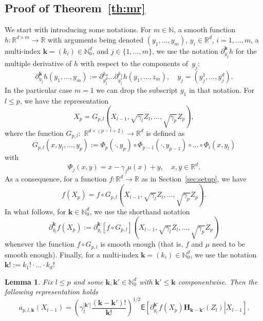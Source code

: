 \documentclass[article]{elsarticle}
\newtheorem{lem}[thm]{Lemma}
\begin{document}
\subsection{Proof of Theorem~\ref{th:mr}}
We start with introducing some notations.
For $m\in\mathbb N$, a smooth function
$h\colon\mathbb R^{d\times m}\to\mathbb R$
with arguments being denoted
$(y_1,\ldots,y_m)$, $y_i\in\mathbb R^d$, $i=1,\ldots,m$,
a multi-index $\mathbf k=(k_i)\in\mathbb N_0^d$,
and $j\in\{1,\ldots,m\}$,
we use the notation $\partial^{\mathbf k}_{y_j} h$ for the multiple derivative of $h$
with respect to the components of~$y_j$:
$$
\partial^{\mathbf k}_{y_j} h(y_1,\ldots,y_m)
:=\partial^{k_d}_{y_j^d}
\ldots
\partial^{k_1}_{y_j^1}
h(y_1,\ldots,z_m),
\quad y_j=(y_j^1,\ldots,y_j^d).
$$
In the particular case $m=1$ we can drop
the subscript $y_1$ in that notation.
For $l\le p$, we have the representation
\[
X_{p}=G_{p,l}(X_{l-1},\sqrt{\gamma_{l}}Z_{l},\ldots,\sqrt{\gamma_{p}}Z_{p}),
\]
where the function \(G_{p,l}:\) \(\mathbb{R}^{d\times(p-l+2)}\to \mathbb{R}^{d}\) is defined as
\begin{equation}
\label{eq:definition-G-p-l}
G_{p,l}(x,y_l,\ldots,y_p):=\Phi_{p}(\cdot,y_{p})\circ\Phi_{p-1}(\cdot,y_{p-1})\circ\ldots\circ\Phi_{l}(x,y_{l})
\end{equation}
with
\[
\Phi_{j}(x,y)=x-\gamma_{j}\mu(x)+y,
\quad x,y\in\mathbb R^d.
\]
As a consequence,
for a function $f\colon\mathbb R^d\to\mathbb R$
as in Section~\ref{sec:setup}, we have
$$
f\left(X_{p}\right) =f\circ G_{p,l}(X_{l-1},\sqrt{\gamma_{l}}Z_{l},\ldots,\sqrt{\gamma_{p}}Z_{p}).
$$
In what follows, for $\mathbf{k}\in\mathbb N_0^d$,
we use the shorthand notation
\begin{equation}
\label{eq:definition-differential-f-p}
\partial_{y_l}^{\mathbf k} f\left(X_{p}\right)
:=\partial_{y_l}^{\mathbf k} [f\circ G_{p,l}](X_{l-1},\sqrt{\gamma_{l}}Z_{l},\ldots,\sqrt{\gamma_{p}}Z_{p})
\end{equation}
whenever the function $f\circ G_{p,l}$ is smooth enough
(that is, $f$ and $\mu$ need to be smooth enough).
Finally, for a multi-index $\mathbf{k}=(k_i)\in\mathbb N_0^d$, we use the notation
\(\mathbf{k} ! :=k_1!\cdot\ldots\cdot k_d !\)

\begin{lem}\label{eq:a_repr}
Fix $l\le p$ and some \(\mathbf{k},\mathbf{k}'\in \mathbb{N}_0^d\) with \(\mathbf{k}'\le \mathbf{k}\) componentwise.  Then the following representation holds
$$
a_{p,l,\mathbf{k}}(X_{l-1})=\left(\gamma_{l}^{|\mathbf{k}'|}\frac{(\mathbf{k}-\mathbf{k}') !}{\mathbf{k}!}\right)^{1/2}
\mathsf E\left[\left.
\partial_{y_l}^{\mathbf{k}'}f(X_p)\mathbf{H}_{\mathbf{k}-\mathbf{k}'}(Z_l)\right|X_{l-1}\right].
$$
\end{lem}
\end{document}
